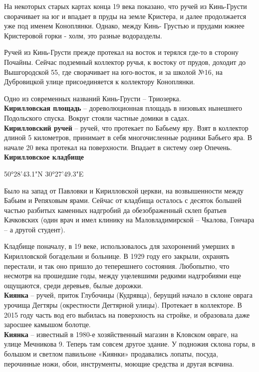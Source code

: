 На некоторых старых картах конца 19 века показано, что ручей из Кинь-Грусти сворачивает на юг и впадает в пруды на земле Кристера, и далее продолжается уже под именем Коноплянки. Однако, между Кинь- Грустью и прудами южнее Кристеровой горки - холм, это разные водоразделы.

Ручей из Кинь-Грусти прежде протекал на восток и терялся где-то в сторону Почайны. Сейчас подземный коллектор ручья, к востоку от прудов, доходит до Вышгородской 55, где сворачивает на юго-восток, и за школой №16, на Дубровицкой улице присоединяется к коллектору Коноплянки.

Одно из современных названий Кинь-Грусти – Триозерка.\\

\textbf{Кирилловская площадь} – дореволюционная площадь в низовьях нынешнего Подольского спуска. Вокруг стояли частные домики в садах.\\

\textbf{Кирилловский ручей} – ручей, что протекает по Бабьему яру. Взят в коллектор длиной 5 километров, принимает в себя многочисленные родники Бабьего яра. В начале 20 века протекал на поверхности. Впадает в систему озер Опечень.\\

\textbf{Кирилловское кладбище} 

50°28'43.1"N 30°27'49.3"E

Было на запад от Павловки и Кирилловской церкви, на возвышенности между Бабьим и Репяховым ярами. Сейчас от кладбища осталось с десяток большей частью разбитых каменных надгробий да обезображенный склеп братьев Качковских (один врач и имел клинику на Маловладимирской – Чкалова, Гончара – а другой студент).

Кладбище поначалу, в 19 веке, использовалось для захоронений умерших в Кирилловской богадельни и больнице. В 1929 году его закрыли, охранять перестали, и так оно пришло до теперешнего состояния. Любопытно, что несмотря на прошедшие годы, между уцелевшими редкими надгробиями еще ощущаются, среди деревьев, былые дорожки.\\

\textbf{Киянка} – ручей, приток Глубочицы (Кудрявца), берущий начало в склоне оврага урочища Дегтяры (окрестности Дегтярной улицы). Протекает в коллекторе. В 2015 году часть вод его выбилась на поверхность на стройке, и образовала даже заросшее камышом болотце.\\

\textbf{Киянка} – известный в 1980-е хозяйственный магазин в Кловском овраге, на улице Мечникова 9. Теперь там совсем другое здание. У подножия склона горы, в большом и светлом павильоне «Киянки» продавались лопаты, посуда, перочинные ножи, обои, инструменты, моющие средства и другая всячина.

